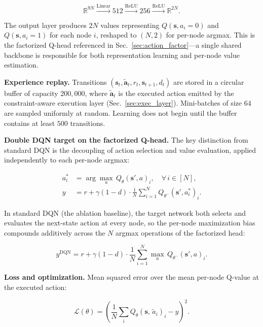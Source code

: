 \documentclass[journal]{IEEEtran}
\begin{document}
\begin{equation}
  \mathbb{R}^{9N}
  \xrightarrow{\text{Linear}} 512
  \xrightarrow{\text{ReLU}} 256
  \xrightarrow{\text{ReLU}} \mathbb{R}^{2N}.
  \label{eq:network}
\end{equation}

The output layer produces $2N$ values representing
$Q(\mathbf{s}, a_i{=}0)$ and $Q(\mathbf{s}, a_i{=}1)$ for each node
$i$, reshaped to $(N, 2)$ for per-node argmax. This is the factorized
Q-head referenced in Sec.~\ref{sec:action_factor}—a single shared
backbone is responsible for both representation learning and per-node
value estimation.

\textbf{Experience replay.} Transitions
$(\mathbf{s}_t, \tilde{\mathbf{a}}_t, r_t, \mathbf{s}_{t+1}, d_t)$ are
stored in a circular buffer of capacity $200{,}000$, where
$\tilde{\mathbf{a}}_t$ is the executed action emitted by the
constraint-aware execution layer (Sec.~\ref{sec:exec_layer}).
Mini-batches of size $64$ are sampled uniformly at random. Learning
does not begin until the buffer contains at least $500$ transitions.

\textbf{Double DQN target on the factorized Q-head.} The key
distinction from standard DQN is the decoupling of action selection and
value evaluation, applied independently to each per-node argmax:

\begin{align}
  a_i^* &= \arg\max_{a}\, Q_\theta(\mathbf{s}', a)_i,
           \quad \forall\, i \in [N],
           \label{eq:ddqn_select} \\
  y     &= r + \gamma (1 - d) \cdot
           \frac{1}{N} \sum_{i=1}^{N} Q_{\theta^-}(\mathbf{s}', a_i^*)_i.
           \label{eq:ddqn_target}
\end{align}

In standard DQN (the ablation baseline), the target network both
selects and evaluates the next-state action at every node, so the
per-node maximization bias compounds additively across the $N$ argmax
operations of the factorized head:

\begin{equation}
  y^{\text{DQN}} = r + \gamma (1 - d) \cdot
  \frac{1}{N} \sum_{i=1}^{N} \max_{a}\, Q_{\theta^-}(\mathbf{s}', a)_i.
  \label{eq:dqn_target2}
\end{equation}

\textbf{Loss and optimization.} Mean squared error over the mean
per-node Q-value at the executed action:

\begin{equation}
  \mathcal{L}(\theta) =
  \left(\frac{1}{N}\sum_i Q_\theta(\mathbf{s},\, \tilde{a}_i)_i - y\right)^{\!2}.
  \label{eq:loss}
\end{equation}
\end{document}
